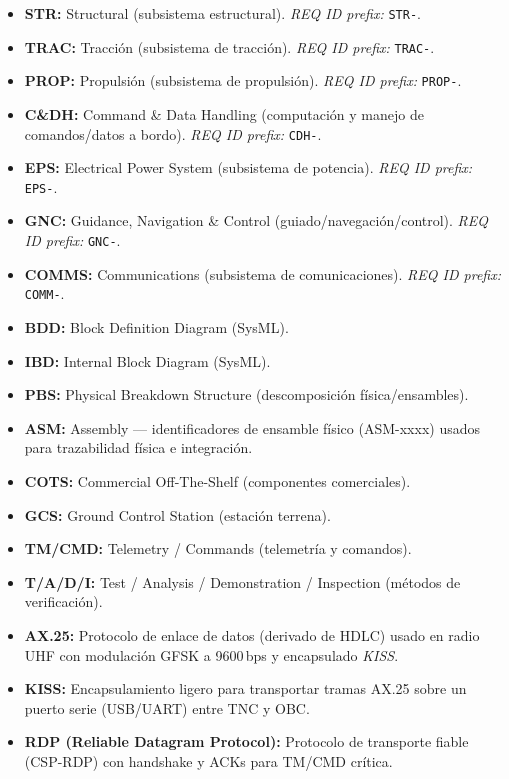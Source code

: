 \begin{itemize}
    \item \textbf{STR:} Structural (subsistema estructural). \textit{REQ ID prefix:} \texttt{STR-}.
    \item \textbf{TRAC:} Tracción (subsistema de tracción). \textit{REQ ID prefix:} \texttt{TRAC-}.
    \item \textbf{PROP:} Propulsión (subsistema de propulsión). \textit{REQ ID prefix:} \texttt{PROP-}.
    \item \textbf{C\&DH:} Command \& Data Handling (computación y manejo de comandos/datos a bordo). \textit{REQ ID prefix:} \texttt{CDH-}.
    \item \textbf{EPS:} Electrical Power System (subsistema de potencia). \textit{REQ ID prefix:} \texttt{EPS-}.
    \item \textbf{GNC:} Guidance, Navigation \& Control (guiado/navegación/control). \textit{REQ ID prefix:} \texttt{GNC-}.
    \item \textbf{COMMS:} Communications (subsistema de comunicaciones). \textit{REQ ID prefix:} \texttt{COMM-}.
    \item \textbf{BDD:} Block Definition Diagram (SysML).
    \item \textbf{IBD:} Internal Block Diagram (SysML).
    \item \textbf{PBS:} Physical Breakdown Structure (descomposición física/ensambles).
    \item \textbf{ASM:} Assembly --- identificadores de ensamble físico (ASM-xxxx) usados para trazabilidad física e integración.
    \item \textbf{COTS:} Commercial Off-The-Shelf (componentes comerciales).
    \item \textbf{GCS:} Ground Control Station (estación terrena).
    \item \textbf{TM/CMD:} Telemetry / Commands (telemetría y comandos).
    \item \textbf{T/A/D/I:} Test / Analysis / Demonstration / Inspection (métodos de verificación).
    \item \textbf{AX.25:} Protocolo de enlace de datos (derivado de HDLC) usado en radio UHF con modulación GFSK a 9600\,bps y encapsulado \emph{KISS}.
    \item \textbf{KISS:} Encapsulamiento ligero para transportar tramas AX.25 sobre un puerto serie (USB/UART) entre TNC y OBC.
    \item \textbf{RDP (Reliable Datagram Protocol):} Protocolo de transporte fiable (CSP-RDP) con handshake y ACKs para TM/CMD crítica.
\end{itemize}
